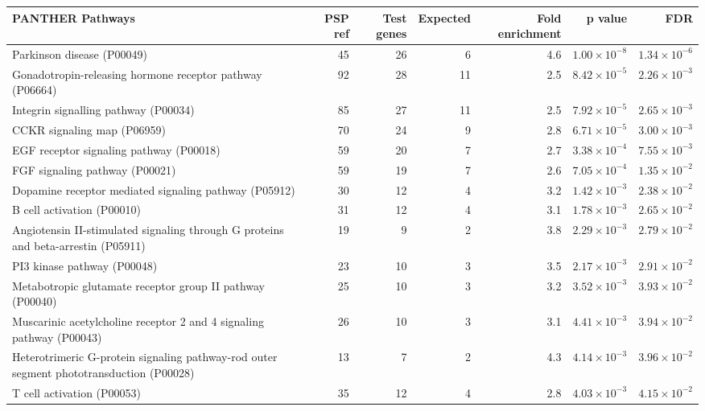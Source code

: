\begin{table}[ht]
\centering
\begin{adjustbox}{width=\textwidth}

\begin{tabular}{lrrrrrr}
  \hline
PANTHER Pathways & PSP ref & Test genes & Expected & Fold enrichment & p value & FDR \\ 
  \hline
Parkinson disease (P00049) & 45 & 26 & 6 & 4.6 & $1.00 \times 10^{-8}$ & $1.34 \times 10^{-6}$ \\ 
  Gonadotropin-releasing hormone receptor pathway (P06664) & 92 & 28 & 11 & 2.5 & $8.42 \times 10^{-5}$ & $2.26 \times 10^{-3}$ \\ 
  Integrin signalling pathway (P00034) & 85 & 27 & 11 & 2.5 & $7.92 \times 10^{-5}$ & $2.65 \times 10^{-3}$ \\ 
  CCKR signaling map (P06959) & 70 & 24 & 9 & 2.8 & $6.71 \times 10^{-5}$ & $3.00 \times 10^{-3}$ \\ 
  EGF receptor signaling pathway (P00018) & 59 & 20 & 7 & 2.7 & $3.38 \times 10^{-4}$ & $7.55 \times 10^{-3}$ \\ 
  FGF signaling pathway (P00021) & 59 & 19 & 7 & 2.6 & $7.05 \times 10^{-4}$ & $1.35 \times 10^{-2}$ \\ 
  Dopamine receptor mediated signaling pathway (P05912) & 30 & 12 & 4 & 3.2 & $1.42 \times 10^{-3}$ & $2.38 \times 10^{-2}$ \\ 
  B cell activation (P00010) & 31 & 12 & 4 & 3.1 & $1.78 \times 10^{-3}$ & $2.65 \times 10^{-2}$ \\ 
  Angiotensin II-stimulated signaling through G proteins and beta-arrestin (P05911) & 19 & 9 & 2 & 3.8 & $2.29 \times 10^{-3}$ & $2.79 \times 10^{-2}$ \\ 
  PI3 kinase pathway (P00048) & 23 & 10 & 3 & 3.5 & $2.17 \times 10^{-3}$ & $2.91 \times 10^{-2}$ \\ 
  Metabotropic glutamate receptor group II pathway (P00040) & 25 & 10 & 3 & 3.2 & $3.52 \times 10^{-3}$ & $3.93 \times 10^{-2}$ \\ 
  Muscarinic acetylcholine receptor 2 and 4 signaling pathway (P00043) & 26 & 10 & 3 & 3.1 & $4.41 \times 10^{-3}$ & $3.94 \times 10^{-2}$ \\ 
  Heterotrimeric G-protein signaling pathway-rod outer segment phototransduction (P00028) & 13 & 7 & 2 & 4.3 & $4.14 \times 10^{-3}$ & $3.96 \times 10^{-2}$ \\ 
  T cell activation (P00053) & 35 & 12 & 4 & 2.8 & $4.03 \times 10^{-3}$ & $4.15 \times 10^{-2}$ \\ 

\end{tabular}
\end{adjustbox}
\end{table}

